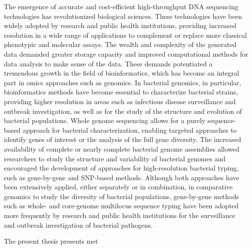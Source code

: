 


The emergence of accurate and cost-efficient high-throughput DNA sequencing technologies has revolutionized biological sciences. These technologies have been widely adopted by research and public health institutions, providing increased resolution in a wide range of applications to complement or replace more classical phenotypic and molecular assays. The wealth and complexity of the generated data demanded greater storage capacity and improved computational methods for data analysis to make sense of the data. These demands potentiated a tremendous growth in the field of bioinformatics, which has become an integral part in omics approaches such as genomics. In bacterial genomics, in particular, bioinformatics methods have become essential to characterize bacterial strains, providing higher resolution in areas such as infectious disease surveillance and outbreak investigation, as well as for the study of the structure and evolution of bacterial populations. Whole genome sequencing allows for a purely sequence-based approach for bacterial characterization, enabling targeted approaches to identify genes of interest or the analysis of the full gene diversity. The increased availability of complete or nearly complete bacterial genome assemblies allowed researchers to study the structure and variability of bacterial genomes and encouraged the development of approaches for high-resolution bacterial typing, such as gene-by-gene and SNP-based methods. Although both approaches have been extensively applied, either separately or in combination, in comparative genomics to study the diversity of bacterial populations, gene-by-gene methods such as whole- and core-genome multilocus sequence typing have been adopted more frequently by research and public health institutions for the surveillance and outbreak investigation of bacterial pathogens.




The present thesis presents met


